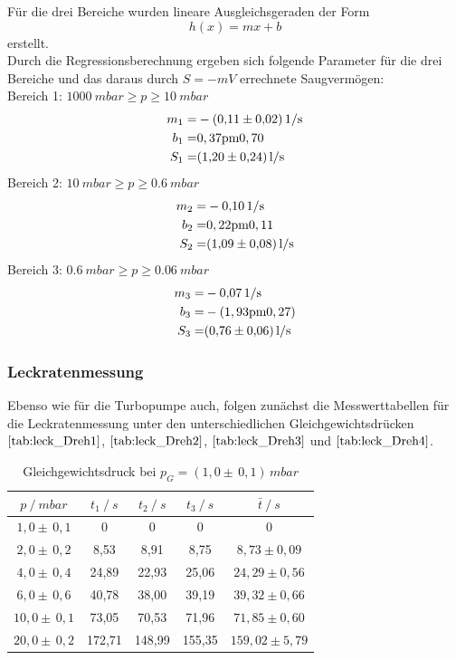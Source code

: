 Für die drei Bereiche wurden lineare Ausgleichsgeraden der Form
\begin{equation}
	h(x)=mx+b
\end{equation}
erstellt.\\
Durch die Regressionsberechnung ergeben sich folgende Parameter für die drei Bereiche und das daraus durch $S=-mV$ errechnete Saugvermögen:\\\vspace{1cm}
Bereich 1: $\SI{1000}{mbar} \geq p \geq \SI{10}{mbar}$\\
\begin{align*}
	m_1=& -\SI{0,11 \pm 0,02}{1/s}\\
	b_1=& \si{0,37 \pm 0,70}\\
	S_1=& \SI{1,20 \pm 0,24}{l/s}
\end{align*}
Bereich 2: $\SI{10}{mbar} \geq p \geq \SI{0,6}{mbar}$\\
\begin{align*}
	m_2=& -\SI{0,10 \pm 0,00}{1/s}\\
	b_2=& \si{0,22 \pm 0,11}\\
	S_2=& \SI{1,09 \pm 0,08}{l/s}
\end{align*}
Bereich 3: $\SI{0,6}{mbar} \geq p \geq \SI{0,06}{mbar}$\\
\begin{align*}
	m_3=& -\SI{0,07 \pm 0,00}{1/s}\\
	b_3=& -\si{(1,93 \pm 0,27)}\\
	S_3=& \SI{0,76 \pm 0,06}{l/s}
\end{align*}

\subsubsection{Leckratenmessung}
Ebenso wie für die Turbopumpe auch, folgen zunächst die Messwerttabellen für die Leckratenmessung
unter den unterschiedlichen Gleichgewichtsdrücken $\ref{tab:leck_Dreh1}$, $\ref{tab:leck_Dreh2}$, $\ref{tab:leck_Dreh3}$ und $\ref{tab:leck_Dreh4}$.
\begin{table}[H]
\centering
\begin{tabular}{c|c|c|c|c}
	{$p \:/\: \si{mbar}$} & {$t_1 \:/\: \si{s} $} & {$t_2 \:/\: \si{s} $} & {$t_3 \:/\: \si{s} $} & {$\bar{t} \:/\: \si{s}$}\\
\midrule
$1,0 \pm \, 0,1$ &0 &0 &0 &0\\
$2,0 \pm \, 0,2$ &   8,53 &  8,91 &  8,75 & $8,73 \pm 0,09$\\
$4,0 \pm \, 0,4$ &   24,89  &  22,93 &  25,06 & $24,29 \pm 0,56 $\\
$6,0 \pm \, 0,6$ &   40,78 &  38,00 &  39,19 & $39,32 \pm 0,66 $\\
$10,0 \pm \, 0,1$ &   73,05 &  70,53 &  71,96 & $71,85 \pm 0,60 $\\
$20,0 \pm \, 0,2$ &   172,71 &  148,99 &  155,35 & $159,02 \pm 5,79 $\\
\end{tabular}
\caption{Gleichgewichtsdruck bei $p_G=(1,0 \pm \, 0,1)  \, \si{mbar}$}
\label{tab:leck_Dreh1}
\end{table}

